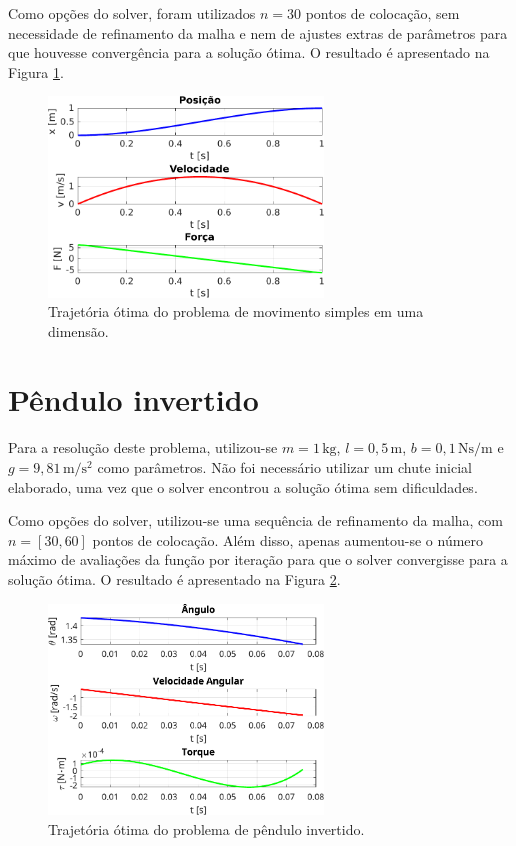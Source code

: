 Como opções do solver, foram utilizados $n=30$ pontos de colocação, sem necessidade de refinamento da malha e nem de ajustes extras de parâmetros para que houvesse convergência para a solução ótima. O resultado é apresentado na Figura \ref{fig:resultados-movimento-simples}.

\begin{figure}[H]
    \centering
    \includegraphics[width=0.65\textwidth]{Cap4/figuras/movimento-simples.pdf}
    \caption{Trajetória ótima do problema de movimento simples em uma dimensão.}
    \label{fig:resultados-movimento-simples}
\end{figure}


\section{Pêndulo invertido}
\label{sec:resultados-pendulo-invertido}

Para a resolução deste problema, utilizou-se $m=1 \, \si{\kilo\gram}$, $l=0,5 \, \si{\meter}$, $b=0,1 \, \si{\newton\second\per\meter}$ e $g=9,81 \, \si{\meter\per\second\squared}$ como parâmetros. Não foi necessário utilizar um chute inicial elaborado, uma vez que o solver encontrou a solução ótima sem dificuldades.

Como opções do solver, utilizou-se uma sequência de refinamento da malha, com $n=[30, 60]$ pontos de colocação. Além disso, apenas aumentou-se o número máximo de avaliações da função por iteração para que o solver convergisse para a solução ótima. O resultado é apresentado na Figura \ref{fig:resultados-pendulo-invertido}.

\begin{figure}[H]
    \centering
    \includegraphics[width=0.65\textwidth]{Cap4/figuras/pendulo-invertido.pdf}
    \caption{Trajetória ótima do problema de pêndulo invertido.}
    \label{fig:resultados-pendulo-invertido}
\end{figure}

